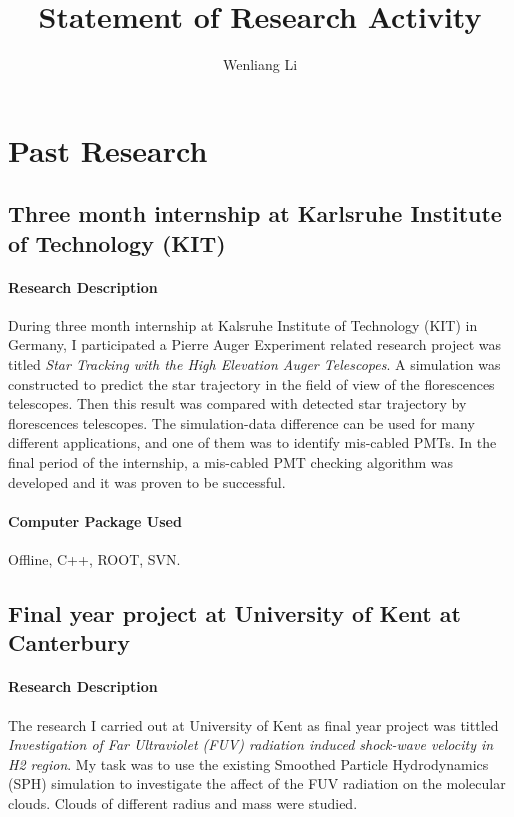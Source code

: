\documentclass[12pt, letterpaper]{article}
\title{Statement of Research Activity}
\author{Wenliang Li}
\begin{document}
\maketitle
\onehalfspacing

\section{Past Research}


\subsection*{Three month internship at Karlsruhe Institute of Technology (KIT)}

\paragraph{Research Description} During three month internship at Kalsruhe Institute of Technology (KIT) in Germany, I participated a Pierre Auger Experiment related research project was titled \emph{Star Tracking with the High Elevation Auger Telescopes}. A simulation was constructed to predict the star trajectory in the field of view of the florescences telescopes. Then this result was compared with detected star trajectory by florescences telescopes. The simulation-data difference can be used for many different applications, and one of them was to identify mis-cabled PMTs. In the final period of the internship, a mis-cabled PMT checking algorithm was developed and it was proven to be successful. 

\paragraph{Computer Package Used} Offline, C++, ROOT, SVN.


\subsection*{Final year project at University of Kent at Canterbury}
\paragraph{Research Description} The research I carried out at University of Kent as final year project was tittled \emph{Investigation of Far Ultraviolet (FUV) radiation induced shock-wave velocity in H2 region}. My task was to use the existing Smoothed Particle Hydrodynamics (SPH) simulation to investigate the affect of the FUV radiation on the molecular clouds. Clouds of different radius and mass were studied. 
\end{document}
